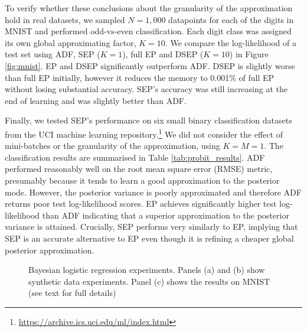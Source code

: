 To verify whether these conclusions about the granularity of the approximation hold in real datasets, we sampled $N=1,000$ datapoints for each of the digits in MNIST and performed odd-vs-even classification. Each digit class was assigned its own global approximating factor, $K=10$. We compare the log-likelihood of a test set using ADF, SEP ($K=1$), full EP and DSEP ($K=10$) in Figure \ref{fig:mnist}. EP and DSEP significantly outperform ADF. DSEP is slightly worse than full EP initially, however it reduces the memory to 0.001\% of full EP without losing substantial accuracy. SEP's accuracy was still increasing at the end of learning and was slightly better than ADF.

Finally, we tested SEP's performance on six small binary classification datasets from the UCI machine learning repository.\footnote{\url{https://archive.ics.uci.edu/ml/index.html}} We did not consider the effect of mini-batches or the granularity of the approximation, using $K=M=1$. The classification results are summarised in Table \ref{tab:probit_results}. ADF performed reasonably well on the root mean square error (RMSE) metric, presumably because it tends to learn a good approximation to the posterior mode. However, the posterior variance is poorly approximated and therefore ADF returns poor test log-likelihood scores. EP achieves significantly higher test log-likelihood than ADF indicating that a superior approximation to the posterior variance is attained. Crucially, SEP performs very similarly to EP, implying that SEP is an accurate alternative to EP even though it is refining a cheaper global posterior approximation.

\begin{figure}
\centering
\def\svgwidth{0.31\linewidth}
\subfigure[\label{fig:sep_probit}]{
}
%
%
\def\svgwidth{0.31\linewidth}
\subfigure[\label{fig:daep_probit}]{
}
%
%
\def\svgwidth{0.31\linewidth}
\subfigure[\label{fig:mnist}]{
}
\caption{Bayesian logistic regression experiments. Panels (a) and (b) show synthetic data experiments. Panel (c) shows the results on MNIST (see text for full details)}
\end{figure}

